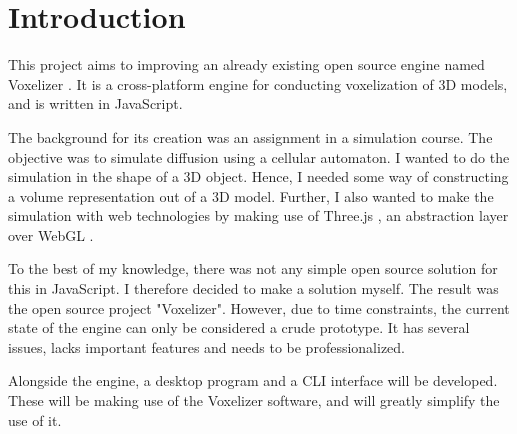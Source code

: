 
\chapter[Introduction]{Introduction}
This project aims to improving an already existing open source \cite{open-source} engine named Voxelizer \cite{voxelizer}. It is a cross-platform engine for conducting voxelization of 3D models, and is written in JavaScript.

The background for its creation was an assignment in a simulation course. The objective was to simulate diffusion using a cellular automaton. I wanted to do the simulation in the shape of a 3D object. Hence, I needed some way of constructing a volume representation out of a 3D model. Further, I also wanted to make the simulation with web technologies by making use of Three.js \cite{three.js}, an abstraction layer over WebGL \cite{webgl}. 

To the best of my knowledge, there was not any simple open source solution for this in JavaScript. I therefore decided to make a solution myself. The result was the open source project "Voxelizer". However, due to time constraints, the current state of the engine can only be considered a crude prototype. It has several issues, lacks important features and needs to be professionalized.

Alongside the engine, a desktop program and a CLI interface will be developed. These will be making use of the Voxelizer software, and will greatly simplify the use of it.